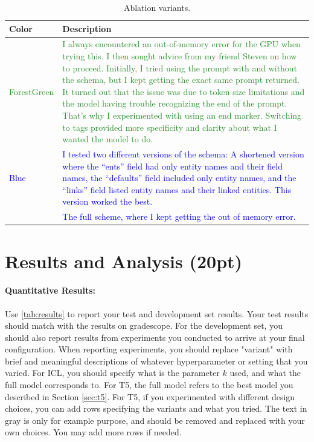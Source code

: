 \documentclass{article}
\begin{document}
\begin{table}[h!]
\centering
\begin{tabular}{p{2cm}p{10cm}}
\toprule
\textbf{Color} & \textbf{Description} \\
\midrule
\textcolor{ForestGreen}{ForestGreen} & \textcolor{ForestGreen}{I always encountered an out-of-memory error for the GPU when trying this. I then sought advice from my friend Steven on how to proceed. Initially, I tried using the prompt with and without the schema, but I kept getting the exact same prompt returned. It turned out that the issue was due to token size limitations and the model having trouble recognizing the end of the prompt. That's why I experimented with using an end marker. Switching to tags provided more specificity and clarity about what I wanted the model to do.} \\
\textcolor{Blue}{Blue} & \textcolor{Blue}{I tested two different versions of the schema:
A shortened version where the “ents” field had only entity names and their field names, the “defaults” field included only entity names, and the “links” field listed entity names and their linked entities. This version worked the best.} \\
& \textcolor{Blue}{The full scheme, where I kept getting the out of memory error.} \\
\bottomrule
\end{tabular}
\caption{Ablation variants.}
\label{tab:ablation_explanation}
\end{table}



\newpage



\section{Results and Analysis (20pt)}

\paragraph{Quantitative Results:} Use \autoref{tab:results} to report your test and development set results. 
Your test results should match with the results on gradescope. 
For the development set, you should also report results from experiments you conducted to arrive at your final configuration.
When reporting experiments, you should replace "variant" with brief and meaningful descriptions of whatever hyperparameter or setting that you varied. 
For ICL, you should specify what is the parameter $k$ used, and what the full model corresponds to. For T5, the full model refers to the best model you described in Section \ref{sec:t5}.
For T5, if you experimented with different design choices, you can add rows specifying the variants and what you tried.
The text in gray is only for example purpose, and should be removed and replaced with your own choices.
You may add more rows if needed.
\end{document}
